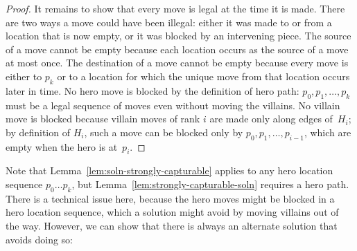 \documentclass[11pt,letterpaper]{article}
\theoremstyle{plain}
\theoremstyle{definition}
\theoremstyle{remark}
\numberwithin{equation}{section}
\begin{document}
\begin{proof}
  It remains to show that every move is legal at the time it is made.
  There are two ways a move could have been illegal:
  either it was made to or from a location that is now empty,
  or it was blocked by an intervening piece.
  The source of a move cannot be empty
  because each location occurs as the source of a move at most once.
  The destination of a move cannot be empty
  because every move is either to $p_k$ or to a location
  for which the unique move from that location occurs later in time.
  No hero move is blocked by the definition of hero path:
  \(p_0, p_1, \ldots, p_k\) must be a legal sequence of moves
  even without moving the villains.
  No villain move is blocked because villain moves of rank \(i\)
  are made only along edges of~\(H_i\);
  by definition of \(H_i\), such a move can be blocked only by
  \(p_0, p_1, \ldots, p_{i-1}\), which are empty when the hero is at~$p_i$.
\end{proof}

Note that Lemma~\ref{lem:soln-strongly-capturable}
applies to any hero location sequence \(p_0 \ldots p_k\),
but Lemma~\ref{lem:strongly-capturable-soln} requires a hero path.
There is a technical issue here, because
the hero moves might be blocked in a hero location sequence,
which a solution might avoid by moving villains out of the way.
However, we can show that there is always an alternate solution
that avoids doing so:
\end{document}
